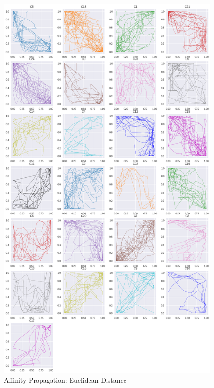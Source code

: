 \begin{figure}[h]
  \centering
  \includegraphics[width=\linewidth,height=\textheight,keepaspectratio]{figs/clusters/CLU_AP_ALL[Ed].png}
  \caption{Affinity Propagation: Euclidean Distance}
\end{figure}

